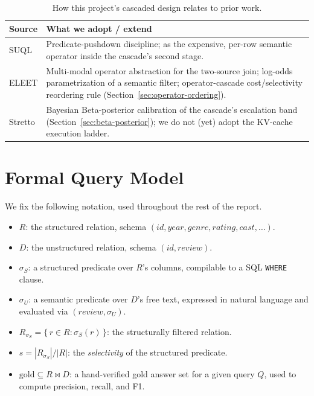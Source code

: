 \begin{table}[h]
\centering\small
\begin{tabular}{p{3.1cm}p{9.5cm}}
\toprule
Source & What we adopt / extend \\
\midrule
SUQL & Predicate-pushdown discipline; \answerfn{} as the expensive,
       per-row semantic operator inside the cascade's second stage. \\
ELEET & Multi-modal operator abstraction for the two-source join;
        log-odds parametrization of a semantic filter; operator-cascade
        cost/selectivity reordering rule (Section~\ref{sec:operator-ordering}). \\
Stretto & Bayesian Beta-posterior calibration of the cascade's
          escalation band (Section~\ref{sec:beta-posterior}); we do not
          (yet) adopt the KV-cache execution ladder. \\
\bottomrule
\end{tabular}
\caption{How this project's cascaded design relates to prior work.}
\label{tab:related-positioning}
\end{table}

\section{Formal Query Model}
\label{sec:formal-model}

We fix the following notation, used throughout the rest of the report.

\begin{itemize}
  \item $R$: the structured relation, schema
        $(\mathit{id}, \mathit{year}, \mathit{genre}, \mathit{rating},
        \mathit{cast}, \dots)$.
  \item $D$: the unstructured relation, schema
        $(\mathit{id}, \mathit{review})$.
  \item $\sigma_S$: a structured predicate over $R$'s columns,
        compilable to a SQL \texttt{WHERE} clause.
  \item $\sigma_U$: a semantic predicate over $D$'s free text, expressed
        in natural language and evaluated via \answerfn{}$(\mathit{review}, \sigma_U)$.
  \item $R_{\sigma_S} = \{\, r \in R : \sigma_S(r) \,\}$: the structurally
        filtered relation.
  \item $s = |R_{\sigma_S}| / |R|$: the \emph{selectivity} of the
        structured predicate.
  \item $\mathrm{gold} \subseteq R \bowtie D$: a hand-verified gold
        answer set for a given query $Q$, used to compute precision,
        recall, and F1.
\end{itemize}

